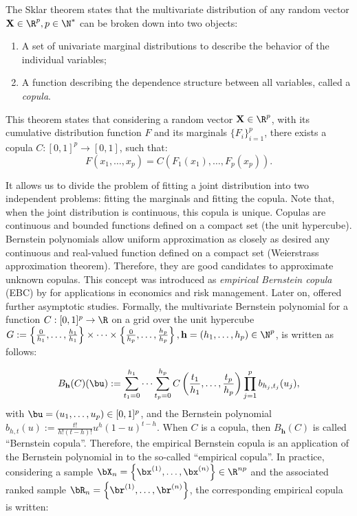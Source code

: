 The  Sklar theorem \citep{joe_1997} states that the multivariate distribution of any random vector $\mathbf{X} \in \R^p, p \in \N^*$ can be broken down into two objects:
\begin{enumerate}
    \item A set of univariate marginal distributions to describe the behavior of the individual variables;
    \item A function describing the dependence structure between all variables, called a \textit{copula}.
\end{enumerate}
This theorem states that considering a random vector $\mathbf{X} \in \R^p$, with its cumulative distribution function $F$ and its marginals $\{F_i\}_{i=1}^p$, there exists a copula $C: [0, 1]^p \rightarrow [0, 1]$, such that:
\begin{equation}
    F(x_1, \dots, x_p) = C\left(F_1(x_1), \dots, F_p(x_p)\right). 
\end{equation}

It allows us to divide the problem of fitting a joint distribution into two independent problems: fitting the marginals and fitting the copula. 
Note that, when the joint distribution is continuous, this copula is unique. 
Copulas are continuous and bounded functions defined on a compact set (the unit hypercube). 
Bernstein polynomials allow uniform approximation as closely as desired any continuous and real-valued function defined on a compact set (Weierstrass approximation theorem). 
Therefore, they are good candidates to approximate unknown copulas. 
This concept was introduced as \textit{empirical Bernstein copula} (EBC) by \cite{sancetta_satchell_2004} for applications in economics and risk management. 
Later on, \cite{segers_2017} offered further asymptotic studies. Formally, the multivariate Bernstein polynomial for a function $C: [0, 1]^p \rightarrow \R$ on a grid over the unit hypercube $G:=\left\{\frac{0}{h_1}, \dots, \frac{h_1}{h_1}\right\} \times \dots \times \left\{\frac{0}{h_p}, \dots, \frac{h_p}{h_p}\right\}, \mathbf{h} = (h_1, \dots, h_p) \in \N^p$, is written as follows: 

\begin{equation}
    B_{\mathbf{h}}(C)(\bu) := \sum_{t_1=0}^{h_1} \dots \sum_{t_p=0}^{h_p} C\left(\frac{t_1}{h_1}, \dots, \frac{t_p}{h_p}\right) \prod_{j=1}^p b_{h_j, t_j}(u_j),\label{eq:ebc}
\end{equation}
with $\bu = (u_1, \dots, u_p) \in [0, 1]^p$, and the Bernstein polynomial $b_{h, t}(u):= \frac{t!}{h!(t-h)!}u^h(1-u)^{t-h}$. 
When $C$ is a copula, then $B_{\mathbf{h}}(C)$ is called ``Bernstein copula''. 
Therefore, the empirical Bernstein copula is an application of the Bernstein polynomial in  to the so-called ``empirical copula''. 
In practice, considering a sample $\bX_n = \left\{\bx^{(1)}, \dots, \bx^{(n)}\right\} \in \R^{np}$ and the associated ranked sample $\bR_n = \left\{\br^{(1)}, \dots, \br^{(n)}\right\}$, the corresponding empirical copula is written: 

